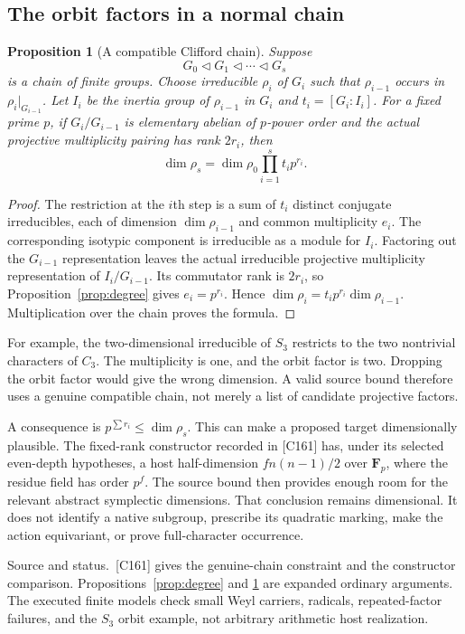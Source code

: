\documentclass[11pt]{article}
\newtheorem{proposition}{Proposition}[section]
\theoremstyle{definition}\newtheorem{definition}[proposition]{Definition}
\newcommand{\F}{\mathbf F}
\newcommand{\source}[1]{\par{\small\textsf{Source and status.}\ #1}\par}
\begin{document}
\subsection{The orbit factors in a normal chain}
\begin{proposition}[A compatible Clifford chain]\label{prop:chain}
Suppose
\[
 G_0\triangleleft G_1\triangleleft\cdots\triangleleft G_s
\]
is a chain of finite groups. Choose irreducible $\rho_i$ of $G_i$ such that $\rho_{i-1}$ occurs in $\rho_i|_{G_{i-1}}$. Let $I_i$ be the inertia group of $\rho_{i-1}$ in $G_i$ and $t_i=[G_i:I_i]$. For a fixed prime $p$, if $G_i/G_{i-1}$ is elementary abelian of $p$-power order and the actual projective multiplicity pairing has rank $2r_i$, then
\[
 \dim\rho_s=\dim\rho_0\prod_{i=1}^s t_i p^{r_i}.
 \tag{15.2}\label{eq:chain}
\]
\end{proposition}
\begin{proof}
The restriction at the $i$th step is a sum of $t_i$ distinct conjugate irreducibles, each of dimension $\dim\rho_{i-1}$ and common multiplicity $e_i$. The corresponding isotypic component is irreducible as a module for $I_i$. Factoring out the $G_{i-1}$ representation leaves the actual irreducible projective multiplicity representation of $I_i/G_{i-1}$. Its commutator rank is $2r_i$, so Proposition~\ref{prop:degree} gives $e_i=p^{r_i}$. Hence $\dim\rho_i=t_i p^{r_i}\dim\rho_{i-1}$. Multiplication over the chain proves the formula.
\end{proof}

For example, the two-dimensional irreducible of $S_3$ restricts to the two nontrivial characters of $C_3$. The multiplicity is one, and the orbit factor is two. Dropping the orbit factor would give the wrong dimension. A valid source bound therefore uses a genuine compatible chain, not merely a list of candidate projective factors.

A consequence is $p^{\sum r_i}\leq\dim\rho_s$. This can make a proposed target dimensionally plausible. The fixed-rank constructor recorded in [C161] has, under its selected even-depth hypotheses, a host half-dimension $f n(n-1)/2$ over $\F_p$, where the residue field has order $p^f$. The source bound then provides enough room for the relevant abstract symplectic dimensions. That conclusion remains dimensional. It does not identify a native subgroup, prescribe its quadratic marking, make the action equivariant, or prove full-character occurrence.

\source{[C161] gives the genuine-chain constraint and the constructor comparison. Propositions~\ref{prop:degree} and \ref{prop:chain} are expanded ordinary arguments. The executed finite models check small Weyl carriers, radicals, repeated-factor failures, and the $S_3$ orbit example, not arbitrary arithmetic host realization.}
\end{document}
